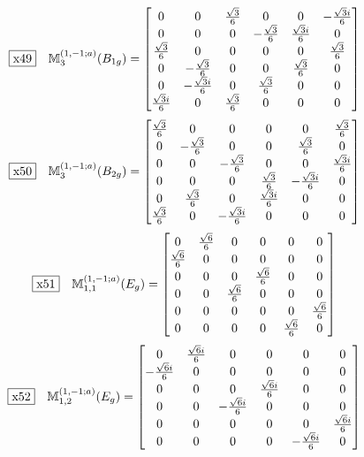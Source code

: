 \documentclass[fleqn,10pt,landscape]{jsarticle}
\begin{document}
\begin{dmath*}
\fbox{x49}\quad \mathbb{M}_{3}^{(1,-1;a)}(B_{1g})=\begin{bmatrix} 0 & 0 & \frac{\sqrt{3}}{6} & 0 & 0 & - \frac{\sqrt{3} i}{6} \\ 0 & 0 & 0 & - \frac{\sqrt{3}}{6} & \frac{\sqrt{3} i}{6} & 0 \\ \frac{\sqrt{3}}{6} & 0 & 0 & 0 & 0 & \frac{\sqrt{3}}{6} \\ 0 & - \frac{\sqrt{3}}{6} & 0 & 0 & \frac{\sqrt{3}}{6} & 0 \\ 0 & - \frac{\sqrt{3} i}{6} & 0 & \frac{\sqrt{3}}{6} & 0 & 0 \\ \frac{\sqrt{3} i}{6} & 0 & \frac{\sqrt{3}}{6} & 0 & 0 & 0 \end{bmatrix}
\end{dmath*}
\begin{dmath*}
\fbox{x50}\quad \mathbb{M}_{3}^{(1,-1;a)}(B_{2g})=\begin{bmatrix} \frac{\sqrt{3}}{6} & 0 & 0 & 0 & 0 & \frac{\sqrt{3}}{6} \\ 0 & - \frac{\sqrt{3}}{6} & 0 & 0 & \frac{\sqrt{3}}{6} & 0 \\ 0 & 0 & - \frac{\sqrt{3}}{6} & 0 & 0 & \frac{\sqrt{3} i}{6} \\ 0 & 0 & 0 & \frac{\sqrt{3}}{6} & - \frac{\sqrt{3} i}{6} & 0 \\ 0 & \frac{\sqrt{3}}{6} & 0 & \frac{\sqrt{3} i}{6} & 0 & 0 \\ \frac{\sqrt{3}}{6} & 0 & - \frac{\sqrt{3} i}{6} & 0 & 0 & 0 \end{bmatrix}
\end{dmath*}
\begin{dmath*}
\fbox{x51}\quad \mathbb{M}_{1,1}^{(1,-1;a)}(E_{g})=\begin{bmatrix} 0 & \frac{\sqrt{6}}{6} & 0 & 0 & 0 & 0 \\ \frac{\sqrt{6}}{6} & 0 & 0 & 0 & 0 & 0 \\ 0 & 0 & 0 & \frac{\sqrt{6}}{6} & 0 & 0 \\ 0 & 0 & \frac{\sqrt{6}}{6} & 0 & 0 & 0 \\ 0 & 0 & 0 & 0 & 0 & \frac{\sqrt{6}}{6} \\ 0 & 0 & 0 & 0 & \frac{\sqrt{6}}{6} & 0 \end{bmatrix}
\end{dmath*}
\begin{dmath*}
\fbox{x52}\quad \mathbb{M}_{1,2}^{(1,-1;a)}(E_{g})=\begin{bmatrix} 0 & \frac{\sqrt{6} i}{6} & 0 & 0 & 0 & 0 \\ - \frac{\sqrt{6} i}{6} & 0 & 0 & 0 & 0 & 0 \\ 0 & 0 & 0 & \frac{\sqrt{6} i}{6} & 0 & 0 \\ 0 & 0 & - \frac{\sqrt{6} i}{6} & 0 & 0 & 0 \\ 0 & 0 & 0 & 0 & 0 & \frac{\sqrt{6} i}{6} \\ 0 & 0 & 0 & 0 & - \frac{\sqrt{6} i}{6} & 0 \end{bmatrix}
\end{dmath*}
\end{document}
